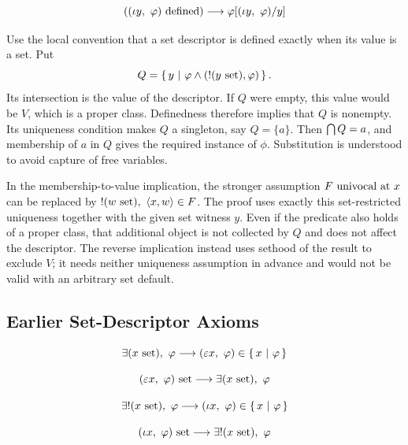 \begin{theorem}
\[
((\iota y,\ \varphi)\mathrm{\ defined})
\longrightarrow
\varphi[(\iota y,\ \varphi)/y]
\]
\end{theorem}
\Proof
Use the local convention that a set descriptor is defined exactly when its
value is a set. Put
\[
Q=\left\{\,y\ \middle|\ \varphi\land(!(y\mathrm{\ set}),\varphi)\,\right\}.
\]
Its intersection is the value of the descriptor. If $Q$ were empty, this
value would be $V$, which is a proper class. Definedness therefore implies
that $Q$ is nonempty. Its uniqueness condition makes $Q$ a singleton,
say $Q=\{a\}$. Then $\bigcap Q=a$, and membership of $a$ in $Q$
gives the required instance of $\phi$. Substitution is understood to avoid
capture of free variables.
\Done

\begin{remark}
\label{thm:pair in function alternative}
In the membership-to-value implication, the stronger assumption
$F\mathrm{\ univocal\ at\ } x$ can be replaced by
$!(w\mathrm{\ set}),\ \langle x,w\rangle\in F$. The proof uses exactly this
set-restricted uniqueness together with the given set witness $y$.
Even if the predicate also holds of a proper class, that additional
object is not collected by $Q$ and does not affect the descriptor.
The reverse implication instead uses sethood of the result to exclude
$V$; it needs neither uniqueness assumption in advance and would not
be valid with an arbitrary set default.
\end{remark}

\subsection{Earlier Set-Descriptor Axioms}
\begin{axiom}
\[
\exists (x\mathrm{\ set}),\ \varphi
\longrightarrow
(\varepsilon x,\  \varphi) \in \left\{\,x\ \middle|\ \varphi\,\right\}
\]
\end{axiom}
\begin{axiom}
\[
(\varepsilon x,\  \varphi) \mathrm{\ set}
\longrightarrow
\exists (x\mathrm{\ set}),\ \varphi
\]
\end{axiom}

\begin{axiom}
\[
\exists! (x\mathrm{\ set}),\ \varphi
\longrightarrow
(\iota x,\  \varphi) \in \left\{\,x\ \middle|\ \varphi\,\right\}
\]
\end{axiom}
\begin{axiom}
\[
(\iota x,\  \varphi) \mathrm{\ set}
\longrightarrow
\exists! (x\mathrm{\ set}),\ \varphi
\]
\end{axiom}



